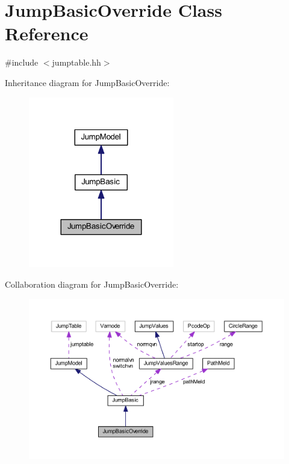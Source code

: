 \hypertarget{class_jump_basic_override}{}\section{Jump\+Basic\+Override Class Reference}
\label{class_jump_basic_override}


{\ttfamily \#include $<$jumptable.\+hh$>$}



Inheritance diagram for Jump\+Basic\+Override\+:
\nopagebreak
\begin{figure}[H]
\begin{center}
\leavevmode
\includegraphics[width=180pt]{class_jump_basic_override__inherit__graph}
\end{center}
\end{figure}


Collaboration diagram for Jump\+Basic\+Override\+:
\nopagebreak
\begin{figure}[H]
\begin{center}
\leavevmode
\includegraphics[width=350pt]{class_jump_basic_override__coll__graph}
\end{center}
\end{figure}
